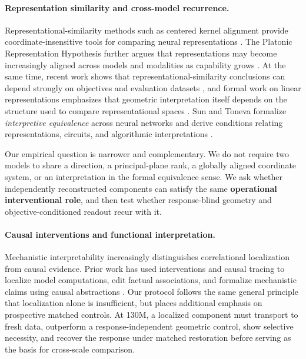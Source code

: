 \documentclass{article}
\begin{document}
\paragraph{Representation similarity and cross-model recurrence.}

Representational-similarity methods such as centered kernel alignment provide coordinate-insensitive tools for comparing neural representations \citep{kornblith2019cka}. The Platonic Representation Hypothesis further argues that representations may become increasingly aligned across models and modalities as capability grows \citep{huh2024platonic}. At the same time, recent work shows that representational-similarity conclusions can depend strongly on objectives and evaluation datasets \citep{ciernik2025objective}, and formal work on linear representations emphasizes that geometric interpretation itself depends on the structure used to compare representational spaces \citep{park2024linear}. Sun and Toneva formalize \emph{interpretive equivalence} across neural networks and derive conditions relating representations, circuits, and algorithmic interpretations \citep{sun2026equivalent}.

Our empirical question is narrower and complementary. We do not require two models to share a direction, a principal-plane rank, a globally aligned coordinate system, or an interpretation in the formal equivalence sense. We ask whether independently reconstructed components can satisfy the same \textbf{operational interventional role}, and then test whether response-blind geometry and objective-conditioned readout recur with it.

\paragraph{Causal interventions and functional interpretation.}

Mechanistic interpretability increasingly distinguishes correlational localization from causal evidence. Prior work has used interventions and causal tracing to localize model computations, edit factual associations, and formalize mechanistic claims using causal abstractions \citep{dai2022knowledge,meng2022rome,geiger2023causal}. Our protocol follows the same general principle that localization alone is insufficient, but places additional emphasis on prospective matched controls. At 130M, a localized component must transport to fresh data, outperform a response-independent geometric control, show selective necessity, and recover the response under matched restoration before serving as the basis for cross-scale comparison.
\end{document}
